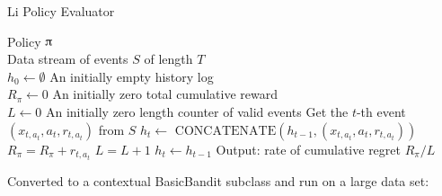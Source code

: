 \documentclass{jss}\usepackage[]{graphicx}\usepackage[]{color}
\begin{document}
\begin{algorithm}[H]
\caption{Li Policy Evaluator}
\label{Alg:LiBandit}
\begin{algorithmic}
\REQUIRE  Policy $\piup$ \\
                 Data stream of events $S$ of length $T$  \\
                 $h_0 \leftarrow \emptyset$ {An initially empty history log}\\
                 $R_\pi \leftarrow 0$ {An initially zero total cumulative reward}\\
                 $L \leftarrow 0$ {An initially zero length counter of valid events}
	\STATE Get the $t$-th event \( (x_{t,a_t},a_{t},r_{t,a_t}) \) from  $S$
	       \STATE $h_{t} \leftarrow $  \(\textrm{CONCATENATE}\left( h_{t-1},(x_{t,a_t},a_{t},r_{t,a_t})  \right)\)
	       \STATE $R_\pi = R_\pi + r_{t,a_t}$
	       \STATE $L = L + 1$
	\ELSE
	        \STATE $h_{t} \leftarrow  h_{t-1} $
	\ENDIF
\ENDFOR
\STATE Output: rate of cumulative regret $R_\pi / L $
\end{algorithmic}
\end{algorithm}

Converted to a contextual BasicBandit subclass and run on a large data set:
\end{document}
